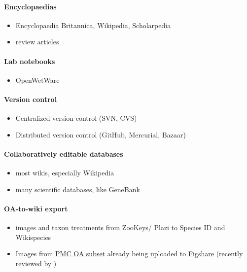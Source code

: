 \documentclass[final,authoryear,3p]{elsarticle-open-drafting}
\begin{document}
	
\paragraph{Encyclopaedias}
\begin{itemize}
	\item Encyclopaedia Britannica, Wikipedia, Scholarpedia
	\item review articles
\end{itemize}

\paragraph{Lab notebooks}
\begin{itemize}
	\item OpenWetWare
\end{itemize}

\paragraph{Version control}
\begin{itemize}
	\item Centralized version control (SVN, CVS)
	\item Distributed version control (GitHub, Mercurial, Bazaar)
\end{itemize}

\paragraph{Collaboratively editable databases}
\begin{itemize}
	\item most wikis, especially Wikipedia
	\item many scientific databases, like GeneBank
\end{itemize}

\paragraph{OA-to-wiki export}
\begin{itemize}
	\item images and taxon treatments from ZooKeys/ Plazi to Species ID and Wikispecies
	\item Images from \href{http://www.ncbi.nlm.nih.gov/pmc/tools/openftlist/}{PMC OA subset} already being uploaded to \href{http://figshare.com/}{Figshare} (recently reviewed by \href{http://dx.doi.org/10.4103/0976-500X.81919}{\citep{singh2011f}})
\end{itemize}
\end{document}
